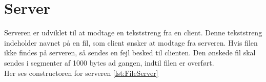 \section{Server}

Serveren er udviklet til at modtage en tekststreng fra en client. Denne tekststreng indeholder navnet på en fil, som client ønsker at modtage fra serveren. Hvis filen ikke findes på serveren, så sendes en fejl besked til clienten.
Den ønskede fil skal sendes i segmenter af 1000 bytes ad gangen, indtil filen er overført. \\

Her ses constructoren for serveren \ref{lst:FileServer}


